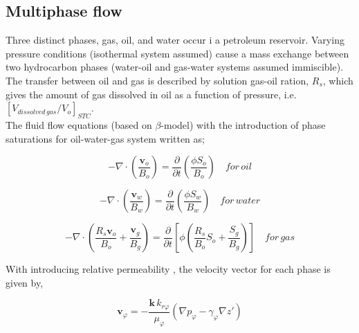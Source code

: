 \documentclass{llncs}
\numberwithin{equation}{section}
\numberwithin{figure}{section}
\numberwithin{table}{section}
\begin{document}
    \subsection{Multiphase flow}
    Three distinct phases, gas, oil, and water occur i a petroleum reservoir. Varying pressure conditions (isothermal system assumed) cause a mass exchange between  two hydrocarbon phases  (water-oil and gas-water systems  assumed immiscible). The  transfer between oil and gas is described by solution gas-oil ration, $R_{s}$, which gives the amount of gas dissolved in oil as a function of pressure, i.e. $[V_{dissolved \, gas}/V_{o}]_{STC}$.\\

    The fluid flow equations (based on $\beta$-model) with the introduction of phase saturations for oil-water-gas system  written as;

    \begin{equation}
    -\nabla \cdot \left( \frac{\mathbf{v}_{o}}{{{B}_{o}}} \right)=\frac{\partial }{\partial t}\left( \frac{\phi {{S}_{o}}}{{{B}_{o}}} \right)\quad for\,oil
    \label{Continuity_oil}
    \end{equation}

    \begin{equation}
    -\nabla \cdot \left( \frac{\mathbf{v}_{w}}{{{B}_{w}}} \right)=\frac{\partial }{\partial t}\left( \frac{\phi {{S}_{w}}}{{{B}_{w}}} \right)\quad for\,water
    \label{Continuity_water}
    \end{equation}

    \begin{equation}
    -\nabla \cdot \left( \frac{{{R}_{s}}{{\mathbf{v}}_{o}}}{{{B}_{o}}}+\frac{{{\mathbf{v}}_{g}}}{{{B}_{g}}} \right)=\frac{\partial }{\partial t}\left[ \phi \left( \frac{{{R}_{s}}}{{{B}_{o}}}{{S}_{o}}+\frac{{{S}_{g}}}{{{B}_{g}}} \right) \right]\quad for\,gas
    \label{Continuity_gas}
    \end{equation}

    With introducing relative permeability , the velocity vector for each phase is given by,

    \begin{equation}
    {{\mathbf{v}}_{\varphi}}=-\frac{\mathbf{k}\,{{k}_{r\varphi}}}{{{\mu }_{\varphi}}}\left( \nabla {{p}_{\varphi}}-{{\gamma }_{\varphi}}\nabla z' \right)
    \label{Darcy_multiphase}
    \end{equation}
\end{document}
